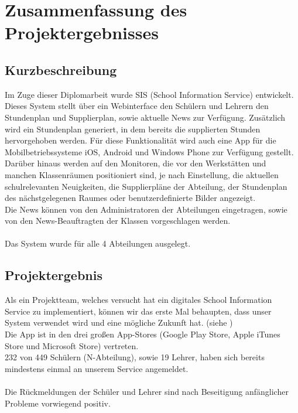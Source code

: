 \chapter[Zusammenfassung]{Zusammenfassung des Projektergebnisses}

\section{Kurzbeschreibung}
Im Zuge dieser Diplomarbeit wurde SIS (School Information Service) entwickelt. \\
Dieses System stellt über ein Webinterface den Schülern und Lehrern den Stundenplan und Supplierplan, sowie aktuelle News zur Verfügung. Zusätzlich wird ein Stundenplan generiert, in dem bereits die supplierten Stunden hervorgehoben werden.
Für diese Funktionalität wird auch eine App für die Mobilbetriebssysteme iOS, Android und Windows Phone zur Verfügung gestellt.\\
Darüber hinaus werden auf den Monitoren, die vor den Werkstätten und manchen Klassenräumen positioniert sind, je nach Einstellung, die aktuellen schulrelevanten Neuigkeiten, die Supplierpläne der Abteilung, der Stundenplan des nächstgelegenen Raumes oder benutzerdefinierte Bilder angezeigt.\\
Die News können von den Administratoren der Abteilungen eingetragen, sowie von den News-Beauftragten der Klassen vorgeschlagen werden.\\
\\
Das System wurde für alle 4 Abteilungen ausgelegt.

\section{Projektergebnis}
Als ein Projektteam, welches versucht hat ein digitales School Information Service zu implementiert, können wir das erste Mal behaupten, dass unser System verwendet wird und eine mögliche Zukunft hat. (siehe )\\
Die App ist in den drei großen App-Stores (Google Play Store, Apple iTunes Store und Microsoft Store) vertreten.\\
232 von 449 Schülern (N-Abteilung), sowie 19 Lehrer, haben sich bereits mindestens einmal an unserem Service angemeldet. \\
\\
Die Rückmeldungen der Schüler und Lehrer sind nach Beseitigung anfänglicher Probleme vorwiegend positiv.

